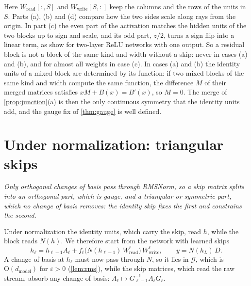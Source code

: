 \documentclass[10pt]{article}
\theoremstyle{definition}
\theoremstyle{remark}
\newcommand{\Wread}{W_{\mathrm{read}}}
\newcommand{\Wwrite}{W_{\mathrm{write}}}
\newcommand{\dm}{d_{\mathrm{model}}}
\newcommand{\Ort}{\mathrm{O}}
\newcommand{\G}{\mathcal{G}}
\newcommand{\takeaway}[1]{\noindent\textit{#1}\par\smallskip}
\begin{document}
Here $\Wread[{:},S]$ and $\Wwrite[S,{:}]$ keep the columns and the rows of the units in $S$. Parts (a), (b) and (d) compare how the two sides scale along rays from the origin. In part (c) the even part of the activation matches the hidden units of the two blocks up to sign and scale, and its odd part, $z/2$, turns a sign flip into a linear term, as \citet[Section~3]{petzka2020symmetries} show for two-layer ReLU networks with one output. So a residual block is not a block of the same kind and width without a skip: never in cases (a) and (b), and for almost all weights in case (c). In cases (a) and (b) the identity units of a mixed block are determined by its function: if two mixed blocks of the same kind and width compute the same function, the difference $M$ of their merged matrices satisfies $xM + B(x) = B'(x)$, so $M = 0$. The merge of \cref{prop:junction}(a) is then the only continuous symmetry that the identity units add, and the gauge fix of \cref{thm:gauge} is well defined.

\section{Under normalization: triangular skips}\label{sec:norm}

\takeaway{Only orthogonal changes of basis pass through RMSNorm, so a skip matrix splits into an orthogonal part, which is gauge, and a triangular or symmetric part, which no change of basis removes: the identity skip fixes the first and constrains the second.}

Under normalization the identity units, which carry the skip, read $h$, while the block reads $N(h)$. We therefore start from the network with learned skips
\begin{equation}\label{eq:prenorm}
h_\ell = h_{\ell-1}A_\ell + f_\ell\big(N(h_{\ell-1})\,\Wread^{\ell}\big)\,\Wwrite^{\ell},\qquad y = N(h_L)\,D.
\end{equation}
A change of basis at $h_\ell$ must now pass through $N$, so it lies in $\G$, which is $\Ort(\dm)$ for $\varepsilon > 0$ (\cref{lem:rms}), while the skip matrices, which read the raw stream, absorb any change of basis: $A_\ell \mapsto G_{\ell-1}^{-1}A_\ell G_\ell$.
\end{document}
